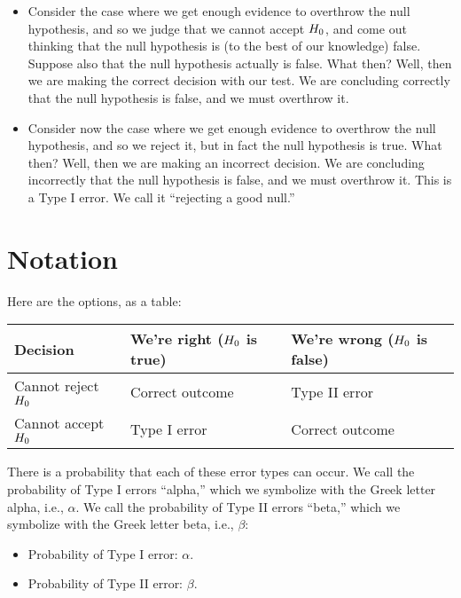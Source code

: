 \documentclass[../../../main.tex]{subfiles}
\begin{document}
\begin{itemize}

  \item Consider the case where we get enough evidence to overthrow the null hypothesis, and so we judge that we cannot accept $\NullHyp/$, and come out thinking that the null hypothesis is (to the best of our knowledge) false. Suppose also that the null hypothesis actually is false. What then? Well, then we are making the correct decision with our test. We are concluding correctly that the null hypothesis is false, and we must overthrow it.

  \item Consider now the case where we get enough evidence to overthrow the null hypothesis, and so we reject it, but in fact the null hypothesis is true. What then? Well, then we are making an incorrect decision. We are concluding incorrectly that the null hypothesis is false, and we must overthrow it. This is a Type I error. We call it ``rejecting a good null.''

\end{itemize}


\section{Notation}

Here are the options, as a table:

\begin{center}
  \begin{tabular}{| l | l | l |}
    \hline
    \textbf{Decision} & \textbf{We're right} ($\NullHyp/$ is true) & \textbf{We're wrong} ($\NullHyp/$ is false) \\ \hline
    Cannot reject $\NullHyp/$ & Correct outcome & Type II error \\ \hline
    Cannot accept $\NullHyp/$ & Type I error & Correct outcome \\ \hline
  \end{tabular}
\end{center}

\noindent
There is a probability that each of these error types can occur. We call the probability of Type I errors ``alpha,'' which we symbolize with the Greek letter alpha, i.e., $\alpha$. We call the probability of Type II errors ``beta,'' which we symbolize with the Greek letter beta, i.e., $\beta$:

\begin{itemize}
  \item Probability of Type I error: $\alpha$.
  \item Probability of Type II error: $\beta$.
\end{itemize}
\end{document}
